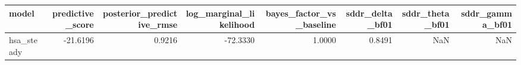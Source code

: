 \begin{tabular}{lrrrrrrr}
\toprule
model & predictive\_score & posterior\_predictive\_rmse & log\_marginal\_likelihood & bayes\_factor\_vs\_baseline & sddr\_delta\_bf01 & sddr\_theta\_bf01 & sddr\_gamma\_bf01 \\
\midrule
hsa\_steady & -21.6196 & 0.9216 & -72.3330 & 1.0000 & 0.8491 & NaN & NaN \\
\bottomrule
\end{tabular}
